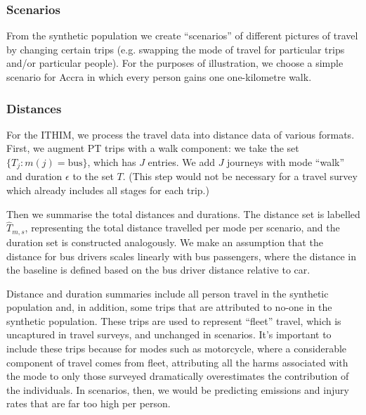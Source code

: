 \documentclass{article}
\begin{document}
\subsubsection{Scenarios} From the synthetic population we create ``scenarios'' of different pictures of travel by changing certain trips (e.g. swapping the mode of travel for particular trips and/or particular people). For the purposes of illustration, we choose a simple scenario for Accra in which every person gains one one-kilometre walk.

  
\subsubsection{Distances}\label{distances}

For the ITHIM, we process the travel data into distance data of various formats. First, we augment PT trips with a walk component: we take the set $\{T_j:m(j)=\text{bus}\}$, which has $J$ entries. We add $J$ journeys with mode ``walk'' and duration $\epsilon$ to the set $T$. (This step would not be necessary for a travel survey which already includes all stages for each trip.)

Then we summarise the total distances and durations. The distance set is labelled $\hat{T}_{m,s}$, representing the total distance travelled per mode per scenario, and the duration set is constructed analogously. We make an assumption that the distance for bus drivers scales linearly with bus passengers, where the distance in the baseline is defined based on the bus driver distance relative to car.

Distance and duration summaries include all person travel in the synthetic population and, in addition, some trips that are attributed to no-one in the synthetic population. These trips are used to represent ``fleet'' travel, which is uncaptured in travel surveys, and unchanged in scenarios. It's important to include these trips because for modes such as motorcycle, where a considerable component of travel comes from fleet, attributing all the harms associated with the mode to only those surveyed dramatically overestimates the contribution of the individuals. In scenarios, then, we would be predicting emissions and injury rates that are far too high per person.

\end{document}
